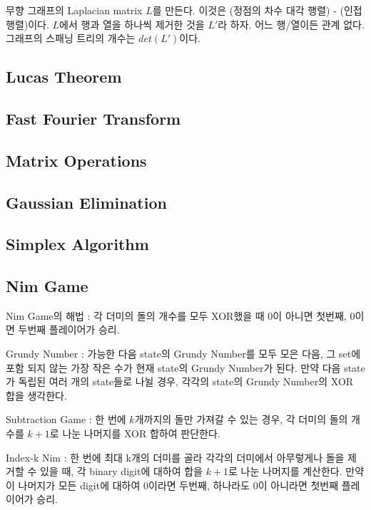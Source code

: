 \documentclass[10pt,landscape,a4paper,twocolumn]{article}
\begin{document}
무향 그래프의 Laplacian matrix $L$를 만든다. 이것은 (정점의 차수 대각 행렬) - (인접행렬)이다.
$L$에서 행과 열을 하나씩 제거한 것을 $L'$라 하자. 어느 행/열이든 관계 없다.
그래프의 스패닝 트리의 개수는 $det(L')$이다.

\subsection{Lucas Theorem}


\subsection{Fast Fourier Transform}


\subsection{Matrix Operations}


\subsection{Gaussian Elimination}


\subsection{Simplex Algorithm}


\subsection{Nim Game}

Nim Game의 해법 : 각 더미의 돌의 개수를 모두 XOR했을 때 $0$이 아니면 첫번째, $0$이면 두번째 플레이어가 승리.

Grundy Number : 가능한 다음 state의 Grundy Number를 모두 모은 다음, 그 set에 포함
되지 않는 가장 작은 수가 현재 state의 Grundy Number가 된다. 만약 다음 state가
독립된 여러 개의 state들로 나뉠 경우, 각각의 state의 Grundy Number의 XOR 합을 생각한다.

Subtraction Game : 한 번에 $k$개까지의 돌만 가져갈 수 있는 경우,
각 더미의 돌의 개수를 $k + 1$로 나눈 나머지를 XOR 합하여 판단한다.

Index-k Nim : 한 번에 최대 k개의 더미를 골라 각각의 더미에서 아무렇게나 돌을
제거할 수 있을 때, 각 binary digit에 대하여 합을 $k + 1$로 나눈 나머지를 계산한다.
만약 이 나머지가 모든 digit에 대하여 $0$이라면 두번째, 하나라도 $0$이 아니라면
첫번째 플레이어가 승리.
\end{document}
